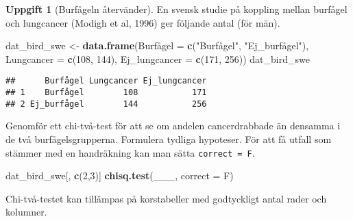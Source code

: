 \documentclass[
]{book}
\newenvironment{Shaded}{\begin{snugshade}}{\end{snugshade}}
\newcommand{\AttributeTok}[1]{\textcolor[rgb]{0.13,0.29,0.53}{#1}}
\newcommand{\DecValTok}[1]{\textcolor[rgb]{0.00,0.00,0.81}{#1}}
\newcommand{\FunctionTok}[1]{\textcolor[rgb]{0.13,0.29,0.53}{\textbf{#1}}}
\newcommand{\NormalTok}[1]{#1}
\newcommand{\OtherTok}[1]{\textcolor[rgb]{0.56,0.35,0.01}{#1}}
\newcommand{\StringTok}[1]{\textcolor[rgb]{0.31,0.60,0.02}{#1}}
\theoremstyle{definition}
\theoremstyle{definition}
\theoremstyle{definition}
\newtheorem{exercise}{Uppgift}[chapter]
\theoremstyle{definition}
\theoremstyle{remark}
\begin{document}
\begin{exercise}[Burfågeln återvänder]

En svensk studie på koppling mellan burfågel och lungcancer (Modigh et al, 1996) ger följande antal (för män).

\begin{Shaded}
\begin{Highlighting}[]
\NormalTok{dat\_bird\_swe }\OtherTok{\textless{}{-}} \FunctionTok{data.frame}\NormalTok{(Burfågel }\OtherTok{=} \FunctionTok{c}\NormalTok{(}\StringTok{"Burfågel"}\NormalTok{, }\StringTok{"Ej\_burfågel"}\NormalTok{),}
              \AttributeTok{Lungcancer =} \FunctionTok{c}\NormalTok{(}\DecValTok{108}\NormalTok{, }\DecValTok{144}\NormalTok{),}
              \AttributeTok{Ej\_lungcancer =} \FunctionTok{c}\NormalTok{(}\DecValTok{171}\NormalTok{, }\DecValTok{256}\NormalTok{))}
\NormalTok{dat\_bird\_swe}
\end{Highlighting}
\end{Shaded}

\begin{verbatim}
##      Burfågel Lungcancer Ej_lungcancer
## 1    Burfågel        108           171
## 2 Ej_burfågel        144           256
\end{verbatim}

Genomför ett chi-två-test för att se om andelen cancerdrabbade än densamma i de två burfågelsgrupperna. Formulera tydliga hypoteser. För att få utfall som stämmer med en handräkning kan man sätta \texttt{correct\ =\ F}.

\begin{Shaded}
\begin{Highlighting}[]
\NormalTok{dat\_bird\_swe[, }\FunctionTok{c}\NormalTok{(}\DecValTok{2}\NormalTok{,}\DecValTok{3}\NormalTok{)]}
\FunctionTok{chisq.test}\NormalTok{(\_\_\_, }\AttributeTok{correct =}\NormalTok{ F)}
\end{Highlighting}
\end{Shaded}

\end{exercise}

Chi-två-testet kan tillämpas på korstabeller med godtyckligt antal rader och kolumner.
\end{document}

